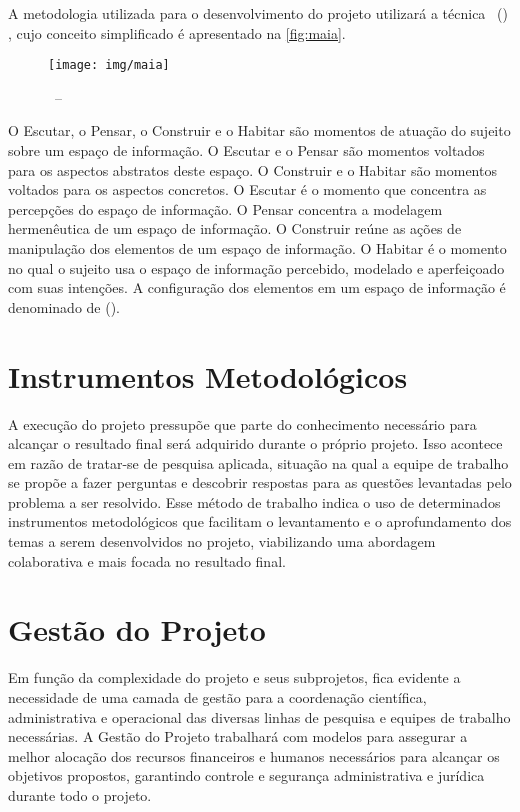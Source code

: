
A metodologia utilizada para o desenvolvimento do projeto utilizará a técnica \MAIA\ (\maia) \cite{costa_um_2010}, cujo conceito simplificado é apresentado na \autoref{fig:maia}.

\begin{figure}[h]
  \centering
  \caption[\maia]{\MAIA\ -- \maia}\label{fig:maia}
  \texttt{[image: img/maia]}
\end{figure}

O Escutar, o Pensar, o Construir e o Habitar são momentos de atuação do sujeito sobre um espaço de informação. O Escutar e o Pensar são momentos voltados para os aspectos abstratos deste espaço. O Construir e o Habitar são momentos voltados para os aspectos concretos. O Escutar é o momento que concentra as percepções do espaço de informação. O Pensar concentra a modelagem hermenêutica de um espaço de informação. O Construir reúne as ações de manipulação dos elementos de um espaço de informação. O Habitar é o momento no qual o sujeito usa o espaço de informação percebido, modelado e aperfeiçoado com suas intenções. A configuração dos elementos em um espaço de informação é denominado de \AI (\siglaai).


\section{Instrumentos Metodológicos}\label{subsubsec:instrumentos_metodologicos}

A execução do projeto pressupõe que parte do conhecimento necessário para alcançar o resultado final será adquirido durante o próprio projeto. Isso acontece em razão de tratar-se de pesquisa aplicada, situação na qual a equipe de trabalho se propõe a fazer perguntas e descobrir respostas para as questões levantadas pelo problema a ser resolvido. Esse método de trabalho indica o uso de determinados instrumentos metodológicos que facilitam o levantamento e o aprofundamento dos temas a serem desenvolvidos no projeto, viabilizando uma abordagem colaborativa e mais focada no resultado final.


\section{Gestão do Projeto}\label{subsubsec:gestao_projeto}

Em função da complexidade do projeto e seus subprojetos, fica evidente a necessidade de uma camada de gestão para a coordenação científica, administrativa e operacional das diversas linhas de pesquisa e equipes de trabalho necessárias. A Gestão do Projeto trabalhará com modelos para assegurar a melhor alocação dos recursos financeiros e humanos necessários para alcançar os objetivos propostos, garantindo controle e segurança administrativa e jurídica durante todo o projeto.
